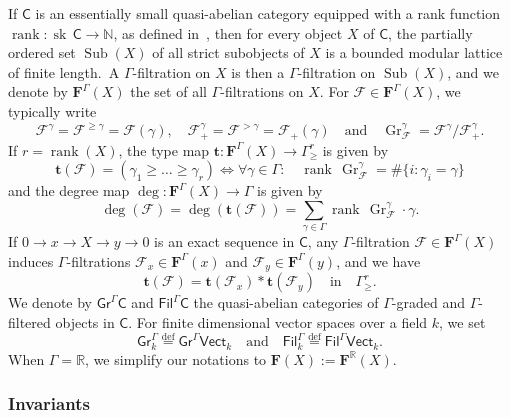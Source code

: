 \documentclass[11pt]{article}
\theoremstyle{definition}
\numberwithin{equation}{section}
\numberwithin{figure}{section}
\numberwithin{table}{section}
\newcommand{\Vect}{\mathsf{Vect}}
\newcommand{\Gra}{\mathsf{Gr}}
\newcommand{\Fil}{\mathsf{Fil}}
\DeclareMathOperator{\rank}{rank}
\DeclareMathOperator{\sk}{sk}
\DeclareMathOperator{\Gr}{Gr}
\DeclareMathOperator{\Sub}{Sub}
\newcommand{\eqd}{\stackrel{\mathrm{def}}{=}}
\newcommand{\sfC}{\mathsf{C}}
\let\oldforall\forall
\renewcommand*{\forall}{\mathrel{\oldforall}}
\begin{document}
If $\sfC$ is an essentially small quasi-abelian category equipped with a rank function $\rank:\sk\,\sfC\rightarrow\mathbb{N}$, as defined in~\cite[3.1]{Co16}, then for every object $X$ of $\sfC$, the partially ordered set $\Sub(X)$ of all strict subobjects of $X$ is a bounded modular lattice of finite length.~A $\Gamma$-filtration on $X$ is then a $\Gamma$-filtration on $\Sub(X)$, and we denote by $\mathbf{F}^{\Gamma}(X)$ the set of all $\Gamma$-filtrations on $X$. For $\mathcal{F}\in\mathbf{F}^{\Gamma}(X)$, we typically write
\[
\mathcal{F}^{\gamma}=\mathcal{F}^{\geq\gamma}=\mathcal{F}(\gamma),\quad\mathcal{F}_{+}^{\gamma}=\mathcal{F}^{>\gamma}=\mathcal{F}_{+}(\gamma)\quad\text{and}\quad\Gr_{\mathcal{F}}^{\gamma}=\mathcal{F}^{\gamma}/\mathcal{F}_{+}^{\gamma}.
\]
If $r=\rank(X)$, the type map $\mathbf{t}:\mathbf{F}^{\Gamma}(X)\rightarrow\Gamma_{\geq}^{r}$ is given by
\[
\mathbf{t}(\mathcal{F})=(\gamma_{1}\geq\dots\geq\gamma_{r})\iff{\forall\gamma\in\Gamma}:\quad\rank\,\Gr_{\mathcal{F}}^{\gamma}=\#\{i:\gamma_{i}=\gamma\}
\]
and the degree map $\deg:\mathbf{F}^{\Gamma}(X)\rightarrow\Gamma$ is given by
\[
\deg(\mathcal{F})=\deg(\mathbf{t}(\mathcal{F}))={\sum_{\gamma\in\Gamma}}\rank\,\Gr_{\mathcal{F}}^{\gamma}\cdot\gamma.
\]
If $0\rightarrow x\rightarrow X\rightarrow y\rightarrow0$ is an exact sequence in $\sfC$, any $\Gamma$-filtration $\mathcal{F}\in\mathbf{F}^{\Gamma}(X)$ induces $\Gamma$-filtrations $\mathcal{F}_{x}\in\mathbf{F}^{\Gamma}(x)$ and $\mathcal{F}_{y}\in\mathbf{F}^{\Gamma}(y)$, and we have
\[
\mathbf{t}(\mathcal{F})=\mathbf{t}(\mathcal{F}_{x})\ast\mathbf{t}(\mathcal{F}_{y})\quad\text{in}\quad\Gamma_{\geq}^{r}.
\]
We denote by $\Gra^{\Gamma}\sfC$ and $\Fil^{\Gamma}\sfC$ the quasi-abelian categories of $\Gamma$-graded and $\Gamma$-filtered objects in $\sfC$. For finite dimensional vector spaces over a field $k$, we set
\[
\Gra_{k}^{\Gamma}\eqd\Gra^{\Gamma}\Vect_{k}\quad\text{and}\quad\Fil_{k}^{\Gamma}\eqd\Fil^{\Gamma}\Vect_{k}.
\]
When $\Gamma=\mathbb{R}$, we simplify our notations to $\mathbf{F}(X):=\mathbf{F}^{\mathbb{R}}(X)$.

\subsubsection{Invariants}\label{subsec:Invariants}
\end{document}
